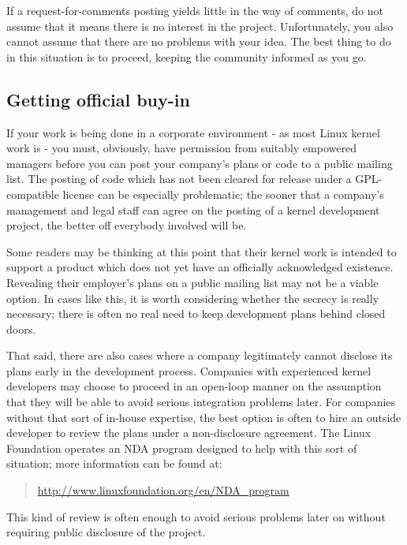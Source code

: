\documentclass[a4paper,8pt,english]{sphinxmanual}
\begin{document}
If a request-for-comments posting yields little in the way of comments, do
not assume that it means there is no interest in the project.
Unfortunately, you also cannot assume that there are no problems with your
idea.  The best thing to do in this situation is to proceed, keeping the
community informed as you go.


\subsection{Getting official buy-in}
\label{process/3.Early-stage:getting-official-buy-in}
If your work is being done in a corporate environment - as most Linux
kernel work is - you must, obviously, have permission from suitably
empowered managers before you can post your company's plans or code to a
public mailing list.  The posting of code which has not been cleared for
release under a GPL-compatible license can be especially problematic; the
sooner that a company's management and legal staff can agree on the posting
of a kernel development project, the better off everybody involved will be.

Some readers may be thinking at this point that their kernel work is
intended to support a product which does not yet have an officially
acknowledged existence.  Revealing their employer's plans on a public
mailing list may not be a viable option.  In cases like this, it is worth
considering whether the secrecy is really necessary; there is often no real
need to keep development plans behind closed doors.

That said, there are also cases where a company legitimately cannot
disclose its plans early in the development process.  Companies with
experienced kernel developers may choose to proceed in an open-loop manner
on the assumption that they will be able to avoid serious integration
problems later.  For companies without that sort of in-house expertise, the
best option is often to hire an outside developer to review the plans under
a non-disclosure agreement.  The Linux Foundation operates an NDA program
designed to help with this sort of situation; more information can be found
at:
\begin{quote}

\href{http://www.linuxfoundation.org/en/NDA\_program}{http://www.linuxfoundation.org/en/NDA\_program}
\end{quote}

This kind of review is often enough to avoid serious problems later on
without requiring public disclosure of the project.
\end{document}
